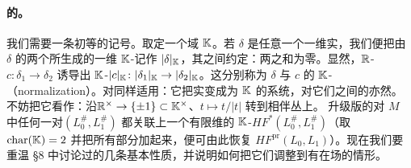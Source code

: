 \paragraph{\trBrane{}的\trFloerCohomology。}\label{sub:floer-cohomology-for-branes}
我们需要一条初等的记号。取定一个\trCoefficients{}域 $\mathbb{K}$。若 $\delta$ 是任意一个一维实\trVectorSpace，我们便把由 $\delta$ 的两个\trOrientation{}所生成的一维 $\mathbb{K}$-\trVectorSpace{}记作 $|\delta|_{\mathbb{K}}$，其\trGenerator{}之间约定：两\trGenerator{}之和为零。显然，$\mathbb{R}$-\trLinear\trIsomorphism{}$c\colon\delta_1\to\delta_2$ 诱导出 $\mathbb{K}$-\trLinear\trIsomorphism{}$|c|_{\mathbb{K}}\colon|\delta_1|_{\mathbb{K}}\to|\delta_2|_{\mathbb{K}}$。这分别称为 $\delta$ 与 $c$ 的 $\mathbb{K}$-\textbf{\trNormalization}（normalization）。\trNormalization{}对\trFamily{}同样适用：它把实\trLineBundle{}变成\trFiber{}为 $\mathbb{K}$ 的\trLocalCoefficient{}系统，对它们之间的\trIsomorphism{}亦然。不妨把它看作：沿\trHomomorphism{}$\mathbb{R}^{\times}\to\{\pm1\}\subset\mathbb{K}^{\times}$、$t\mapsto t/|t|$ 转到相伴丛上。
升级版的\trFloerCohomology{}对 $M$ 中任何一对\trExactLagrangianBrane{}$(L_0^{\#},L_1^{\#})$ 都关联上一个有限维\trGraded{}的 $\mathbb{K}$-\trVectorSpace{}$HF^*(L_0^{\#},L_1^{\#})$（取 $\mathrm{char}(\mathbb{K})=2$ 并把所有\trGraded{}部分加起来，便可由此恢复 $HF^{\mathrm{pr}}(L_0,L_1)$）。现在我们要重温 §8 中讨论过的几条基本性质，并说明如何把它们调整到有\trBraneStructure{}在场的情形。
